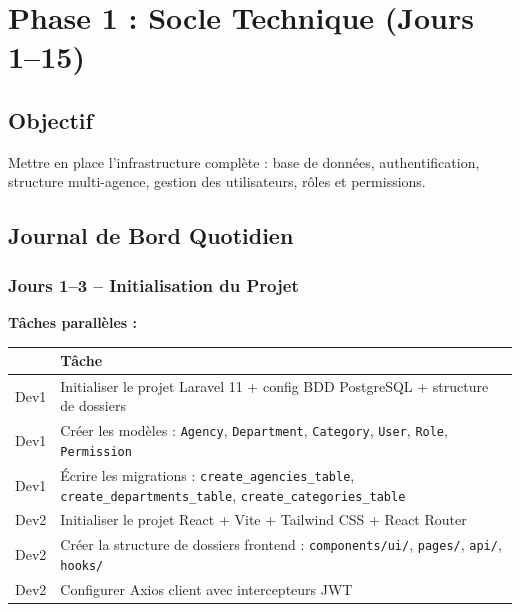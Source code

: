 \documentclass[12pt,a4paper]{report}
\begin{document}
\chapter{Phase 1 : Socle Technique (Jours 1--15)}

\section*{Objectif}
Mettre en place l'infrastructure complète : base de données, authentification, structure multi-agence, gestion des utilisateurs, rôles et permissions.

\section{Journal de Bord Quotidien}

\subsection*{Jours 1--3 -- Initialisation du Projet}

\textbf{Tâches parallèles :}

\begin{tabularx}{\textwidth}{l X}
    \toprule
    & \textbf{Tâche} \\
    \midrule
    Dev1 & Initialiser le projet Laravel 11 + config BDD PostgreSQL + structure de dossiers \\
    Dev1 & Créer les modèles : \texttt{Agency}, \texttt{Department}, \texttt{Category}, \texttt{User}, \texttt{Role}, \texttt{Permission} \\
    Dev1 & Écrire les migrations : \texttt{create\_agencies\_table}, \texttt{create\_departments\_table}, \texttt{create\_categories\_table} \\
    Dev2 & Initialiser le projet React + Vite + Tailwind CSS + React Router \\
    Dev2 & Créer la structure de dossiers frontend : \texttt{components/ui/}, \texttt{pages/}, \texttt{api/}, \texttt{hooks/} \\
    Dev2 & Configurer Axios client avec intercepteurs JWT \\
    \bottomrule
\end{tabularx}
\end{document}
